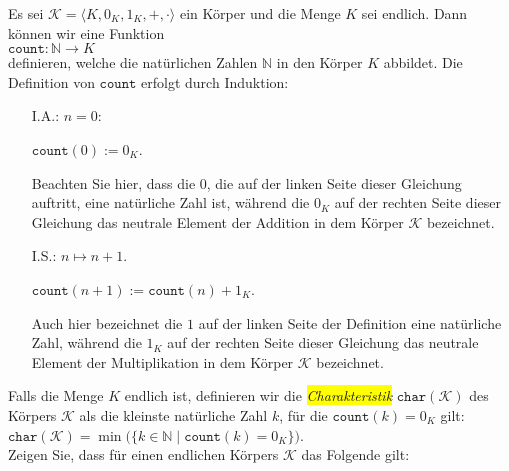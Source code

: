 \exercise
Es sei $\mathcal{K} = \langle K, 0_K, 1_K, +, \cdot \rangle$ ein K\"{o}rper und die Menge $K$ sei endlich.
Dann k\"{o}nnen wir eine Funktion 
\\[0.2cm]
\hspace*{1.3cm}
$\mathtt{count}: \mathbb{N} \rightarrow K$
\\[0.2cm]
definieren, welche die nat\"{u}rlichen Zahlen $\mathbb{N}$ in den K\"{o}rper $K$ abbildet.  Die Definition
von $\mathtt{count}$ erfolgt durch Induktion:
\begin{enumerate}
\item[I.A.:] $n = 0$:

             $\mathtt{count}(0) := 0_K$.

             Beachten Sie hier, dass die $0$, die auf der linken Seite dieser Gleichung auftritt,
             eine nat\"{u}rliche Zahl ist, w\"{a}hrend die $0_K$ auf der rechten Seite dieser Gleichung
             das neutrale Element der Addition in dem K\"{o}rper $\mathcal{K}$ bezeichnet.
\item[I.S.:] $n \mapsto n + 1$.

             $\mathtt{count}(n+1) := \mathtt{count}(n) + 1_K$.

             Auch hier bezeichnet die $1$ auf der linken Seite der Definition eine nat\"{u}rliche Zahl,
             w\"{a}hrend die $1_K$ auf der rechten Seite dieser Gleichung das neutrale Element der
             Multiplikation in dem K\"{o}rper $\mathcal{K}$ bezeichnet.
\end{enumerate}
Falls die Menge $K$ endlich ist, definieren wir die \colorbox{yellow}{\emph{Charakteristik}}
$\mathtt{char}(\mathcal{K})$ des K\"{o}rpers $\mathcal{K}$ als die kleinste nat\"{u}rliche Zahl $k$, f\"{u}r die
$\mathtt{count}(k) = 0_K$ gilt:
\\[0.2cm]
\hspace*{1.3cm}
$\mathtt{char}(\mathcal{K}) = \min\bigl(\{ k \in \mathbb{N} \mid \mathtt{count}(k) = 0_K \}\bigr)$.
\\[0.2cm]
Zeigen Sie, dass f\"{u}r einen endlichen K\"{o}rpers $\mathcal{K}$ das Folgende gilt:
